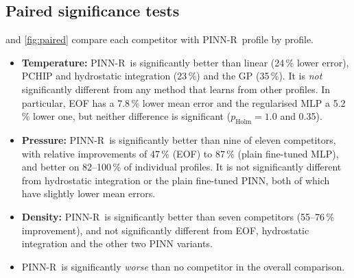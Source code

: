 \documentclass[11pt,a4paper]{article}
\newcommand{\ours}{PINN-R}
\begin{document}
\subsection{Paired significance tests}
 and \cref{fig:paired} compare each competitor with \ours\ profile by profile.
\begin{itemize}[leftmargin=*]
\item \textbf{Temperature:} \ours\ is significantly better than linear (24\,\% lower error), PCHIP and hydrostatic integration (23\,\%) and the GP (35\,\%). It is \emph{not} significantly different from any method that learns from other profiles. In particular, EOF has a 7.8\,\% lower mean error and the regularised MLP a 5.2\,\% lower one, but neither difference is significant ($p_\mathrm{Holm}=1.0$ and 0.35).
\item \textbf{Pressure:} \ours\ is significantly better than nine of eleven competitors, with relative improvements of 47\,\% (EOF) to 87\,\% (plain fine-tuned MLP), and better on 82--100\,\% of individual profiles. It is not significantly different from hydrostatic integration or the plain fine-tuned PINN, both of which have slightly lower mean errors.
\item \textbf{Density:} \ours\ is significantly better than seven competitors (55--76\,\% improvement), and not significantly different from EOF, hydrostatic integration and the other two PINN variants.
\item \ours\ is significantly \emph{worse} than no competitor in the overall comparison.
\end{itemize}
\end{document}
